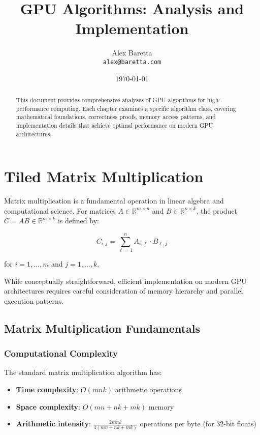 \documentclass{amsbook}
\title{GPU Algorithms: Analysis and Implementation}
\author{Alex Baretta \\
        \texttt{alex@baretta.com}}
\date{\today}
\theoremstyle{definition}
\begin{document}
\maketitle

\tableofcontents

\begin{abstract}
This document provides comprehensive analyses of GPU algorithms for high-performance computing. Each chapter examines a specific algorithm class, covering mathematical foundations, correctness proofs, memory access patterns, and implementation details that achieve optimal performance on modern GPU architectures.
\end{abstract}

\chapter{Tiled Matrix Multiplication}

Matrix multiplication is a fundamental operation in linear algebra and computational science. For matrices $A \in \mathbb{R}^{m \times n}$ and $B \in \mathbb{R}^{n \times k}$, the product $C = AB \in \mathbb{R}^{m \times k}$ is defined by:

\begin{equation}
C_{i,j} = \sum_{\ell=1}^{n} A_{i,\ell} \cdot B_{\ell,j}
\end{equation}

for $i = 1, \ldots, m$ and $j = 1, \ldots, k$.

While conceptually straightforward, efficient implementation on modern GPU architectures requires careful consideration of memory hierarchy and parallel execution patterns.

\section{Matrix Multiplication Fundamentals}

\subsection{Computational Complexity}

The standard matrix multiplication algorithm has:
\begin{itemize}
\item \textbf{Time complexity}: $O(mnk)$ arithmetic operations
\item \textbf{Space complexity}: $O(mn + nk + mk)$ memory
\item \textbf{Arithmetic intensity}: $\frac{2mnk}{4(mn + nk + mk)}$ operations per byte (for 32-bit floats)
\end{itemize}
\end{document}
